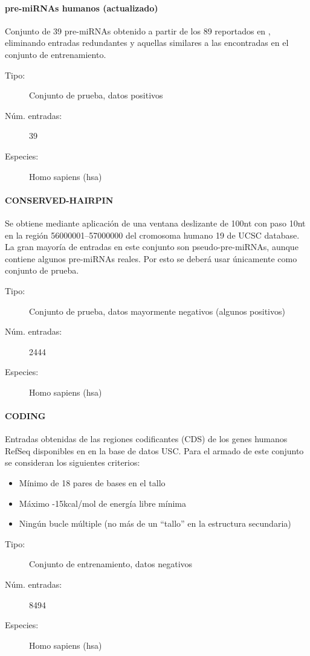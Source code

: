 \documentclass[12pt,bibliography=oldstyle,DIV=12,parskip=half-,titlepage]{scrartcl}
\begin{document}
\paragraph{pre-miRNAs humanos (actualizado)}
Conjunto de 39 pre-miRNAs obtenido a partir de los 89 reportados en
\cite{bentwich}, eliminando entradas redundantes y aquellas similares
a las encontradas en el conjunto de entrenamiento.
\begin{description}
\item[Tipo:] Conjunto de prueba, datos positivos
\item[Núm. entradas:] 39
\item[Especies:]  Homo sapiens (hsa)
\end{description}

\bigskip


\paragraph{CONSERVED-HAIRPIN}
Se obtiene mediante aplicación de una ventana deslizante de 100nt con
paso 10nt en la región 56000001--57000000 del cromosoma humano 19 de
UCSC database. La gran mayoría de entradas en este conjunto son
pseudo-pre-miRNAs, aunque contiene algunos pre-miRNAs reales.  Por
esto se deberá usar únicamente como conjunto de prueba.
\begin{description}
\item[Tipo:] Conjunto de prueba, datos mayormente negativos (algunos
  positivos)
\item[Núm. entradas:] 2444
\item[Especies:]  Homo sapiens (hsa)
\end{description}
\paragraph{CODING}
Entradas obtenidas de las regiones codificantes (CDS) de los genes
humanos RefSeq disponibles en en la base de datos USC.  Para
el armado de este conjunto se consideran los siguientes criterios:
\begin{itemize}
\item Mínimo de 18 pares de bases en el tallo
\item Máximo -15kcal/mol de energía libre mínima
\item Ningún bucle múltiple (no más de un ``tallo'' en la estructura
  secundaria)
\end{itemize}
\begin{description}
\item[Tipo:] Conjunto de entrenamiento, datos negativos
\item[Núm. entradas:] 8494
\item[Especies:]  Homo sapiens (hsa)
\end{description}
%
%
%
%
%
\end{document}
